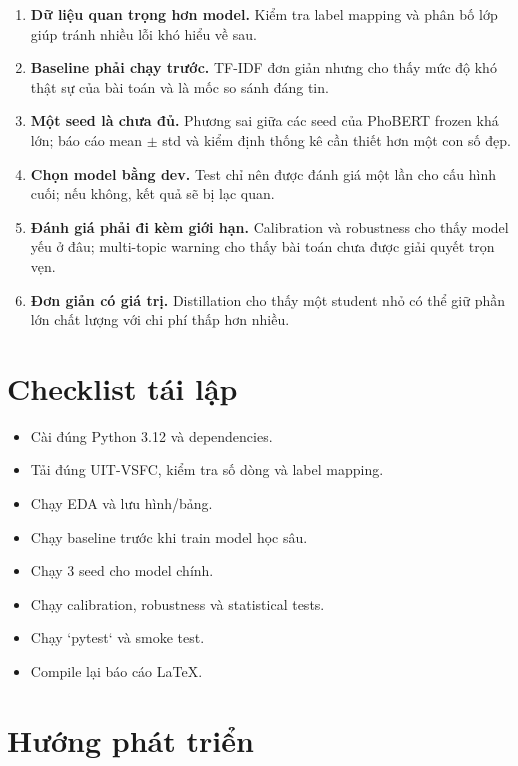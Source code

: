 \documentclass[12pt,a4paper]{report}
\begin{document}
\begin{enumerate}[leftmargin=1.2cm]
  \item \textbf{Dữ liệu quan trọng hơn model.} Kiểm tra label mapping và phân bố lớp giúp tránh nhiều lỗi khó hiểu về sau.
  \item \textbf{Baseline phải chạy trước.} TF-IDF đơn giản nhưng cho thấy mức độ khó thật sự của bài toán và là mốc so sánh đáng tin.
  \item \textbf{Một seed là chưa đủ.} Phương sai giữa các seed của PhoBERT frozen khá lớn; báo cáo mean \(\pm\) std và kiểm định thống kê cần thiết hơn một con số đẹp.
  \item \textbf{Chọn model bằng dev.} Test chỉ nên được đánh giá một lần cho cấu hình cuối; nếu không, kết quả sẽ bị lạc quan.
  \item \textbf{Đánh giá phải đi kèm giới hạn.} Calibration và robustness cho thấy model yếu ở đâu; multi-topic warning cho thấy bài toán chưa được giải quyết trọn vẹn.
  \item \textbf{Đơn giản có giá trị.} Distillation cho thấy một student nhỏ có thể giữ phần lớn chất lượng với chi phí thấp hơn nhiều.
\end{enumerate}

\section{Checklist tái lập}

\begin{itemize}[leftmargin=1.2cm]
  \item[$\circ$] Cài đúng Python 3.12 và dependencies.
  \item[$\circ$] Tải đúng UIT-VSFC, kiểm tra số dòng và label mapping.
  \item[$\circ$] Chạy EDA và lưu hình/bảng.
  \item[$\circ$] Chạy baseline trước khi train model học sâu.
  \item[$\circ$] Chạy 3 seed cho model chính.
  \item[$\circ$] Chạy calibration, robustness và statistical tests.
  \item[$\circ$] Chạy `pytest` và smoke test.
  \item[$\circ$] Compile lại báo cáo LaTeX.
\end{itemize}

\section{Hướng phát triển}
\end{document}
